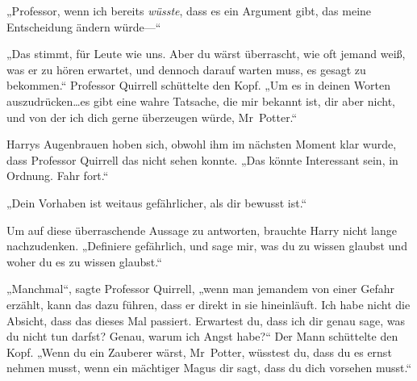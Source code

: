 „Professor, wenn ich bereits \emph{wüsste}, dass es ein Argument gibt, das meine Entscheidung ändern würde—“

„Das stimmt, für Leute wie uns. Aber du wärst überrascht, wie oft jemand weiß, was er zu hören erwartet, und dennoch darauf warten muss, es gesagt zu bekommen.“ Professor Quirrell schüttelte den Kopf. „Um es in deinen Worten auszudrücken…es gibt eine wahre Tatsache, die mir bekannt ist, dir aber nicht, und von der ich dich gerne überzeugen würde, Mr~Potter.“

Harrys Augenbrauen hoben sich, obwohl ihm im nächsten Moment klar wurde, dass Professor Quirrell das nicht sehen konnte. „Das könnte Interessant sein, in Ordnung. Fahr fort.“

„Dein Vorhaben ist weitaus gefährlicher, als dir bewusst ist.“

Um auf diese überraschende Aussage zu antworten, brauchte Harry nicht lange nachzudenken. „Definiere gefährlich, und sage mir, was du zu wissen glaubst und woher du es zu wissen glaubst.“

„Manchmal“, sagte Professor Quirrell, „wenn man jemandem von einer Gefahr erzählt, kann das dazu führen, dass er direkt in sie hineinläuft. Ich habe nicht die Absicht, dass das dieses Mal passiert. Erwartest du, dass ich dir genau sage, was du nicht tun darfst? Genau, warum ich Angst habe?“ Der Mann schüttelte den Kopf. „Wenn du ein Zauberer wärst, Mr~Potter, wüsstest du, dass du es ernst nehmen musst, wenn ein mächtiger Magus dir sagt, dass du dich vorsehen musst.“

